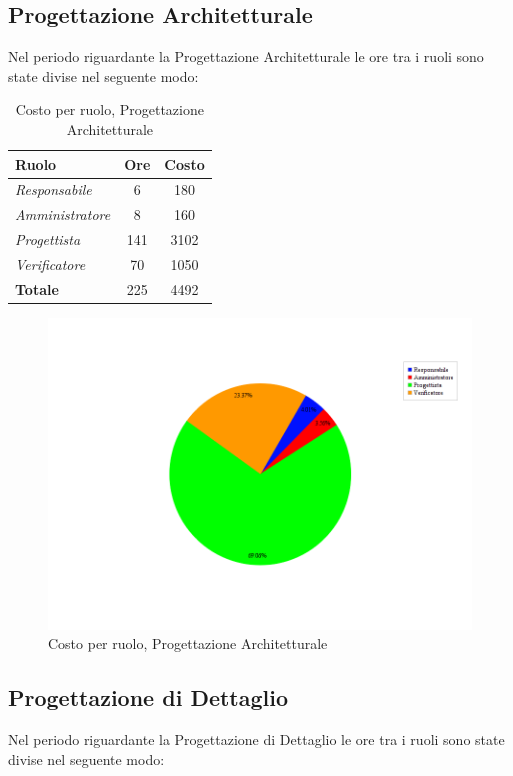 \newpage
\subsection{Progettazione Architetturale}
Nel periodo riguardante la Progettazione Architetturale le ore tra i ruoli sono state divise nel seguente modo:

\begin{table}[H]
	\begin{center}
		\begin{tabular}{|l|c|c|}
			\hline
			\textbf{Ruolo}	& \textbf{Ore} &	\textbf{Costo}	 \\
			\hline
			\textit{Responsabile}	&	6	&	180		\\
			\hline
			\textit{Amministratore}	&	8	&	160		\\
			\hline
			\textit{Progettista}		&	141	&	3102	\\
			\hline
			\textit{Verificatore}	&	70	&	1050	\\
			\hline
			\textbf{Totale}	&	225	&	4492	\\
			\hline
		\end{tabular}
	\end{center}
	\caption{Costo per ruolo, Progettazione Architetturale}
\end{table}

\begin{figure}[H]
	\centering
	\includegraphics[scale=0.5]{immagini/Grafi/CostoPA}
	\caption{Costo per ruolo, Progettazione Architetturale}
\end{figure}

\newpage
\subsection{Progettazione di Dettaglio}
Nel periodo riguardante la Progettazione di Dettaglio le ore tra i ruoli sono state divise nel seguente modo:


